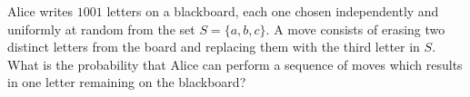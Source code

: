 Alice writes $1001$ letters on a blackboard, each one chosen independently and uniformly at random from the set $S=\{a, b, c\}$. A move consists of erasing two distinct letters from the board and replacing them with the third letter in $S$. What is the probability that Alice can perform a sequence of moves which results in one letter remaining on the blackboard?

